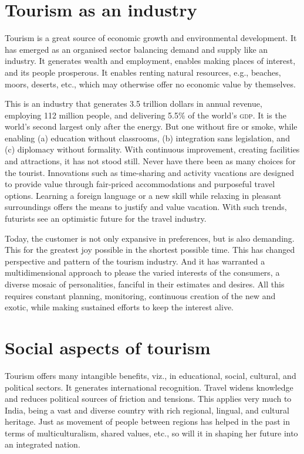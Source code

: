 
\section{Tourism as an industry} %
\label{sec:tai}

Tourism is a great source of economic growth and environmental development. It has emerged as an organised sector balancing demand and supply like an industry. It generates wealth and employment, enables making places of interest, and its people prosperous. It enables renting natural resources, e.g., beaches, moors, deserts, etc., which may otherwise offer no economic value by themselves.

This is an industry that generates 3.5 trillion dollars in annual revenue, employing 112 million people, and delivering 5.5\% of the world's \textsc{gdp}. It is the world's second largest only after the energy. But one without fire or smoke, while enabling (a) education without classrooms, (b) integration sans legislation, and (c) diplomacy without formality. With continuous improvement, creating facilities and attractions, it has not stood still. Never have there been as many choices for the tourist. Innovations such as time-sharing and activity vacations are designed to provide value through fair-priced accommodations and purposeful travel options. Learning a foreign language or a new skill while relaxing in pleasant surroundings offers the means to justify and value vacation. With such trends, futurists see an optimistic future for the travel industry.

Today, the customer is not only expansive in preferences, but is also demanding. This for the greatest joy possible in the shortest possible time. This has changed perspective and pattern of the tourism industry. And it has warranted a multidimensional approach to please the varied interests of the consumers, a diverse mosaic of personalities, fanciful in their estimates and desires. All this requires constant planning, monitoring, continuous creation of the new and exotic, while making sustained efforts to keep the interest alive.


\section{Social aspects of tourism} %
\label{sec:sat}

Tourism offers many intangible benefits, viz., in educational, social, cultural, and political sectors. It generates international recognition. Travel widens knowledge and reduces political sources of friction and tensions. This applies very much to India, being a vast and diverse country with rich regional, lingual, and cultural heritage. Just as movement of people between regions has helped in the past in terms of multiculturalism, shared values, etc., so will it in shaping her future into an integrated nation.

